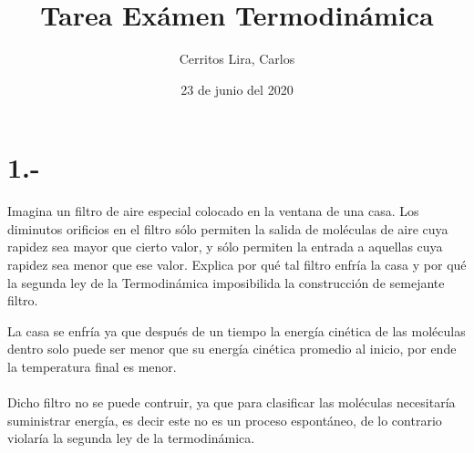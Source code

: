 \documentclass{article}
\title{Tarea Exámen Termodinámica}
\author{Cerritos Lira, Carlos}
\date{23 de junio del 2020}
\begin{document}
\maketitle
\section*{1.-}
Imagina un filtro de aire especial colocado en la ventana de una casa. Los diminutos orificios en el filtro sólo
permiten la salida de moléculas de aire cuya rapidez sea mayor que cierto valor, y sólo permiten la entrada a aquellas cuya 
rapidez sea menor que ese valor. Explica por qué tal filtro enfría la casa y por qué la segunda ley de la Termodinámica 
imposibilida la construcción de semejante filtro. 
\begin{tcolorbox}[breakable]
    La casa se enfría ya que después de un tiempo la energía cinética de las moléculas dentro solo puede ser menor 
    que su energía cinética promedio al inicio, por ende la temperatura final es menor. \\ \\
    Dicho filtro no se puede contruir, ya que para clasificar las moléculas necesitaría suministrar 
    energía, es decir este no es un proceso espontáneo, de lo contrario violaría la segunda ley de la termodinámica.
\end{tcolorbox}
\end{document}
